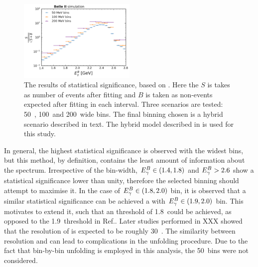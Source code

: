 \begin{figure}[htbp!]
    \centering
    \includegraphics[width=0.5\textwidth]{figures/fitting/binning_significance.pdf}
    \caption{\label{fig:binning_significance}The results of statistical significance, based on .
    Here the $S$ is takes as number of \BtoXsgamma events after fitting and $B$ is taken as non-\BtoXsgamma events expected after fitting in each \EB interval.
    Three scenarios are tested: 50~\mev, 100~\mev and 200~\mev wide bins.
    The final binning chosen is a hybrid scenario described in  text.
    The hybrid model described in  is used for this study.
    }    
\end{figure}

In general, the highest statistical significance is observed with the widest bins, but this method, by definition, contains the least amount of information about the spectrum.
Irrespective of the bin-width,  ${E^B_{\gamma}}\in(1.4,1.8)$ and ${E^B_{\gamma}}>2.6$ show a statistical significance lower than unity, therefore the selected binning should attempt to maximise it.
In the case of ${E^B_{\gamma}}\in(1.8,2.0)$ bin, it is observed that a similar statistical significance can be achieved a with ${E^B_{\gamma}}\in(1.9,2.0)$ bin.
This motivates to extend it, such that an \EB threshold of 1.8~\gev could be achieved, as opposed to the 1.9~\gev threshold in Ref.\cite{BaBar:2007yhb}.
Later studies performed in XXX showed that the resolution of \EB is expected to be roughly 30~\mev.
The similarity between resolution and \EB can lead to complications in the unfolding procedure.
Due to the fact that bin-by-bin unfolding is employed in this analysis, the 50~\mev bins were not considered.

